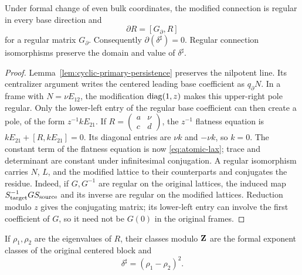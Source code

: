 \begin{proposition}
\label{prop:rank2-rigidity}
%
%
Under formal change of even bulk coordinates, the modified connection is
regular in every base direction and
\begin{equation}
 \partial R=[G_\partial,R]
 \label{eq:atomic-lax}
\end{equation}
for a regular matrix \(G_\partial\).  Consequently
\(\partial(\delta^\sharp)=0\).  Regular connection isomorphisms preserve the
domain and value of \(\delta^\sharp\).
\end{proposition}

\begin{proof}
Lemma~\ref{lem:cyclic-primary-persistence} preserves the nilpotent line.
Its centralizer argument writes the centered leading base coefficient as
\(q_\partial N\).  In a frame with \(N=\nu E_{12}\), the modification
\(\operatorname{diag}(1,z)\) makes this upper-right pole regular.  Only the lower-left
entry of the regular base coefficient can then create a pole, of the form
\(z^{-1}kE_{21}\).  If
\(R=\left(\begin{smallmatrix}a&\nu\\c&d\end{smallmatrix}\right)\), the
\(z^{-1}\) flatness equation is
\(kE_{21}+[R,kE_{21}]=0\).  Its diagonal entries are \(\nu k\) and
\(-\nu k\), so \(k=0\).  The constant term of the flatness equation is now
\eqref{eq:atomic-lax}; trace and determinant are constant under infinitesimal
conjugation.  A regular isomorphism carries \(N\), \(L\), and the modified
lattice to their counterparts and conjugates the residue.  Indeed, if
\(G,G^{-1}\) are regular on the original lattices, the induced map
\(S_{\rm target}^{-1}GS_{\rm source}\) and its inverse are regular on the
modified lattices.  Reduction modulo \(z\) gives the conjugating matrix;
its lower-left entry can involve the first coefficient of \(G\), so it
need not be \(G(0)\) in the original frames.
%
\end{proof}

\begin{proposition}
\label{prop:residue-discriminant-exponents}
%
%
%
If \(\rho_1,\rho_2\) are the eigenvalues of \(R\), their classes modulo
\(\mathbf Z\) are the formal exponent classes of the original centered block and
\[
 \delta^\sharp=(\rho_1-\rho_2)^2.
\]
\end{proposition}

